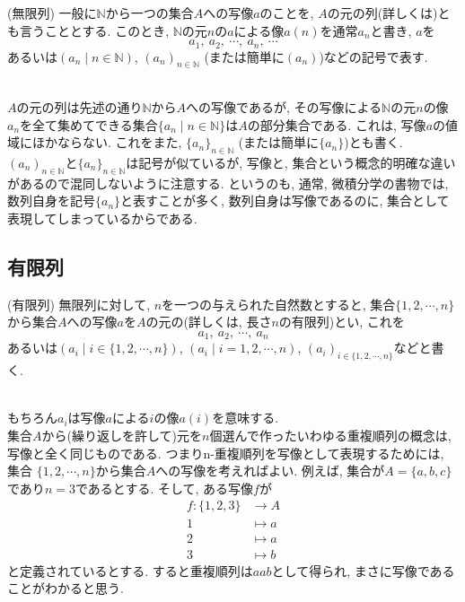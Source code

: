 \documentclass[a4j]{jsarticle}
\begin{document}
\begin{itembox}[l]{ (無限列)}
  一般に$\mathbb{N}$から一つの集合$A$への写像$a$のことを, $A$の元の列(詳しくは)とも言うこととする. このとき, $\mathbb{N}$の元$n$の$a$による像$a(n)$を通常$a_n$と書き, $a$を$$ a_1,\:a_2,\:\cdots,\:a_n,\:\cdots $$あるいは$(a_n \mid n \in \mathbb{N})$, $(a_n)_{n \in \mathbb{N}}$ (または簡単に$(a_n)$)などの記号で表す.
\end{itembox}\\

$A$の元の列は先述の通り$\mathbb{N}$から$A$への写像であるが, その写像による$\mathbb{N}$の元$n$の像$a_n$を全て集めてできる集合$\{a_n \mid n \in \mathbb{N}\}$は$A$の部分集合である. これは, 写像$a$の値域にほかならない. これをまた, $\{a_n\}_{n \in \mathbb{N}}$ (または簡単に$\{a_n\}$)とも書く. \\

 $(a_n)_{n \in \mathbb{N}}$と$\{a_n\}_{n \in \mathbb{N}}$は記号が似ているが, 写像と, 集合という概念的明確な違いがあるので混同しないように注意する. というのも, 通常, 微積分学の書物では, 数列自身を記号$\{a_n\}$と表すことが多く, 数列自身は写像であるのに, 集合として表現してしまっているからである.

\subsection{有限列}

\begin{itembox}[l]{ (有限列)}
  無限列に対して, $n$を一つの与えられた自然数とすると, 集合$\{1,2,\cdots,n\}$から集合$A$への写像$a$を$A$の元の(詳しくは, 長さ$n$の有限列)とい, これを$$ a_1,\:a_2,\:\cdots,\:a_n$$あるいは$(a_i \mid i \in \{1,2,\cdots,n\})$, $(a_i \mid i = 1,2,\cdots,n)$, $(a_i)_{i \in \{1,2,\cdots,n\}}$などと書く.
\end{itembox}\\

もちろん$a_i$は写像$a$による$i$の像$a(i)$を意味する. \\

 集合$A$から(繰り返しを許して)元を$n$個選んで作ったいわゆる重複順列の概念は, 写像と全く同じものである. つまりn-重複順列を写像として表現するためには, 集合
$\{1,2,\cdots,n\}$から集合$A$への写像を考えればよい. 例えば, 集合が$A=\{a,b,c\}$であり$n=3$であるとする. そして, ある写像$f$が
\begin{align*}
  f : \{1,2,3\} & \rightarrow A \\
  1             & \mapsto a     \\
  2             & \mapsto a     \\
  3             & \mapsto b
\end{align*}
と定義されているとする. すると重複順列は$aab$として得られ, まさに写像であることがわかると思う.
\end{document}
